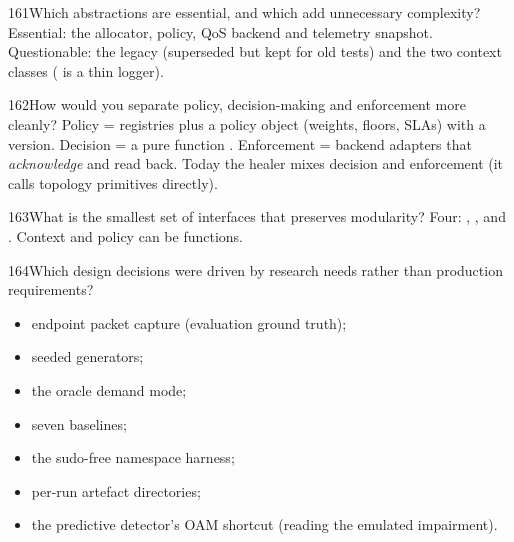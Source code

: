 \begin{qa}{161}{Which abstractions are essential, and which add unnecessary complexity?}
Essential: the allocator, policy, QoS backend and telemetry snapshot. Questionable: the legacy 
(superseded but kept for old tests) and the two context classes ( is a thin logger).
\end{qa}

\begin{qa}{162}{How would you separate policy, decision-making and enforcement more cleanly?}
Policy = registries plus a policy object (weights, floors, SLAs) with a version. Decision = a pure function
. Enforcement = backend adapters that \emph{acknowledge} and read back. Today the
healer mixes decision and enforcement (it calls topology primitives directly).
\end{qa}

\begin{qa}{163}{What is the smallest set of interfaces that preserves modularity?}
Four: , ,  and
. Context and policy can be functions.
\end{qa}

\begin{qa}{164}{Which design decisions were driven by research needs rather than production requirements?}
\begin{itemize}
\item endpoint packet capture (evaluation ground truth);
\item seeded generators;
\item the oracle demand mode;
\item seven baselines;
\item the sudo-free namespace harness;
\item per-run artefact directories;
\item the predictive detector's OAM shortcut (reading the emulated impairment).
\end{itemize}
\end{qa}
